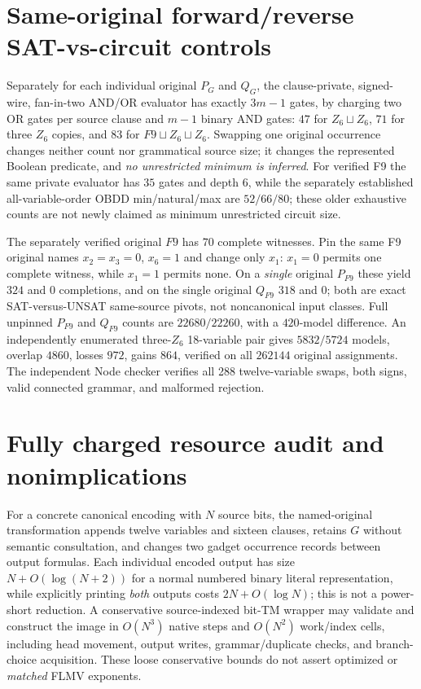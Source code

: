 \documentclass[11pt]{article}
\begin{document}
\section{Same-original forward/reverse SAT-vs-circuit controls}
Separately for each individual original $P_G$ and $Q_G$, the clause-private, signed-wire, fan-in-two AND/OR evaluator has exactly $3m-1$ gates, by charging two OR gates per source clause and $m-1$ binary AND gates: $47$ for $Z_6\sqcup Z_6$, $71$ for three $Z_6$ copies, and $83$ for $F9\sqcup Z_6\sqcup Z_6$. Swapping one original occurrence changes neither count nor grammatical source size; it changes the represented Boolean predicate, and \emph{no unrestricted minimum is inferred}. For verified F9 the same private evaluator has $35$ gates and depth $6$, while the separately established all-variable-order OBDD min/natural/max are $52/66/80$; these older exhaustive counts are not newly claimed as minimum unrestricted circuit size.

The separately verified original $F9$ has $70$ complete witnesses. Pin the same F9 original names $x_2=x_3=0$, $x_6=1$ and change only $x_1$: $x_1=0$ permits one complete witness, while $x_1=1$ permits none. On a \emph{single} original $P_{F9}$ these yield $324$ and $0$ completions, and on the single original $Q_{F9}$ $318$ and $0$; both are exact SAT-versus-UNSAT same-source pivots, not noncanonical input classes. Full unpinned $P_{F9}$ and $Q_{F9}$ counts are $22680/22260$, with a $420$-model difference. An independently enumerated three-$Z_6$ 18-variable pair gives $5832/5724$ models, overlap $4860$, losses $972$, gains $864$, verified on all $262144$ original assignments. The independent Node checker verifies all 288 twelve-variable swaps, both signs, valid connected grammar, and malformed rejection.

\section{Fully charged resource audit and nonimplications}
For a concrete canonical encoding with $N$ source bits, the named-original transformation appends twelve variables and sixteen clauses, retains $G$ without semantic consultation, and changes two gadget occurrence records between output formulas. Each individual encoded output has size $N+O(\log(N+2))$ for a normal numbered binary literal representation, while explicitly printing \emph{both} outputs costs $2N+O(\log N)$; this is not a power-short reduction. A conservative source-indexed bit-TM wrapper may validate and construct the image in $O(N^3)$ native steps and $O(N^2)$ work/index cells, including head movement, output writes, grammar/duplicate checks, and branch-choice acquisition. These loose conservative bounds do not assert optimized or \emph{matched} FLMV exponents.
\end{document}
